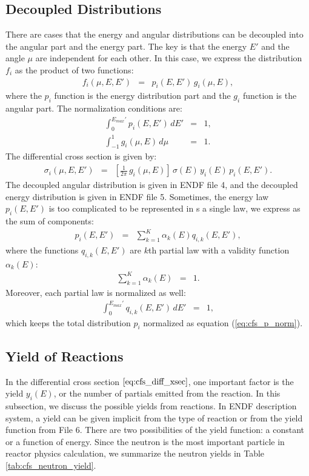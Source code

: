 \subsection{Decoupled Distributions}
There are cases that the energy and angular distributions can be decoupled into the angular part and the energy part. The key is that the energy $E'$ and the angle $\mu$ are independent for each other. In this case, we express the distribution $f_i$ as the product of two functions:
\begin{eqnarray}
f_i(\mu,E,E') &=& p_i(E,E')\,g_i(\mu,E),
\end{eqnarray}
where the $p_i$ function is the energy distribution part and the $g_i$ function is the angular part. The normalization conditions are:
\begin{eqnarray}
\label{eq:cfs_p_norm}
\int_{0}^{E_{max}'}p_i(E,E')\,dE' &=& 1,\\
\label{eq:cfs_g_norm}
\int_{-1}^{1}g_i(\mu,E)\,d\mu &=& 1.
\end{eqnarray}
The differential cross section is given by:
\begin{eqnarray}
\sigma_i(\mu,E,E') &=& \left[\frac{1}{2\pi}\,g_i(\mu,E)\right]\,\sigma(E)\,y_i(E)\,p_i(E,E').
\end{eqnarray}
The decoupled angular distribution is given in ENDF file 4, and the decoupled energy distribution is given in ENDF file 5. Sometimes, the energy law $p_i(E,E')$ is too complicated to be represented in s a single law, we express as the sum of components:
\begin{eqnarray}
p_i(E,E') &=& \sum_{k=1}^{K} \alpha_k(E) q_{i,k}(E,E'),
\end{eqnarray}
where the functions $q_{i,k}(E,E')$ are $k$th partial law with a validity function $\alpha_{k}(E)$:
\begin{eqnarray}
\sum_{k=1}^{K}\alpha_k(E) &=& 1.
\end{eqnarray}
Moreover, each partial law is normalized as well:
\begin{eqnarray}
\int_{0}^{E_{max}'}q_{i,k}(E,E')\,dE' &=& 1,
\end{eqnarray}
which keeps the total distribution $p_i$ normalized as equation (\ref{eq:cfs_p_norm}).

\subsection{Yield of Reactions}
In the differential cross section $\ref{eq:cfs_diff_xsec}$, one important factor is the yield $y_i(E)$, or the number of partials emitted from the reaction. In this subsection, we discuss the possible yields from reactions. In ENDF description system, a yield can be given implicit from the type of reaction or from the yield function from File 6. There are two possibilities of the yield function: a constant or a function of energy. Since the neutron is the most important particle in reactor physics calculation, we summarize the neutron yields in Table \ref{tab:cfs_neutron_yield}.

